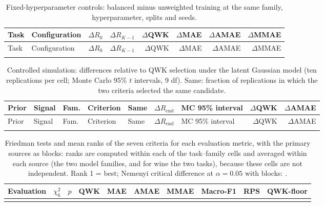 \documentclass[10pt]{article}
\begin{document}
{\footnotesize
\begin{longtable}{@{}llrrrrrr@{}}
\caption{Fixed-hyperparameter controls: balanced minus unweighted training at the same family, hyperparameter, splits and seeds.}\label{tab:s-controls}\\
\toprule
Task & Configuration & $\Delta R_0$ & $\Delta R_{K-1}$ & $\Delta$QWK & $\Delta$MAE & $\Delta$AMAE & $\Delta$MMAE\\
\midrule\endfirsthead
\toprule
Task & Configuration & $\Delta R_0$ & $\Delta R_{K-1}$ & $\Delta$QWK & $\Delta$MAE & $\Delta$AMAE & $\Delta$MMAE\\
\midrule\endhead
\bottomrule\endfoot

\end{longtable}
}

{\footnotesize
\begin{longtable}{@{}lllllrlrr@{}}
\caption{Controlled simulation: differences relative to QWK selection under the latent Gaussian model (ten replications per cell; Monte Carlo 95\% $t$ intervals, 9 df). Same: fraction of replications in which the two criteria selected the same candidate.}\label{tab:s-sim}\\
\toprule
Prior & Signal & Fam. & Criterion & Same & $\Delta R_{\mathrm{end}}$ & MC 95\% interval & $\Delta$QWK & $\Delta$AMAE\\
\midrule\endfirsthead
\toprule
Prior & Signal & Fam. & Criterion & Same & $\Delta R_{\mathrm{end}}$ & MC 95\% interval & $\Delta$QWK & $\Delta$AMAE\\
\midrule\endhead
\bottomrule\endfoot

\end{longtable}
}

{\footnotesize
\begin{longtable}{@{}lrr*{7}{r}@{}}
\caption{Friedman tests and mean ranks of the seven criteria for each evaluation metric, with the \FriedBlocks{} primary sources as blocks: ranks are computed within each of the \NCells{} task--family cells and averaged within each source (the two model families, and for wine the two tasks), because these cells are not independent. Rank 1 = best; Nemenyi critical difference at $\alpha=0.05$ with \FriedBlocks{} blocks: \NemenyiCD{}.}\label{tab:s-friedman}\\
\toprule
Evaluation & $\chi^2_6$ & $p$ & QWK & MAE & AMAE & MMAE & Macro-F1 & RPS & QWK-floor\\
\midrule\endfirsthead
\bottomrule\endfoot

\end{longtable}
}
\end{document}
